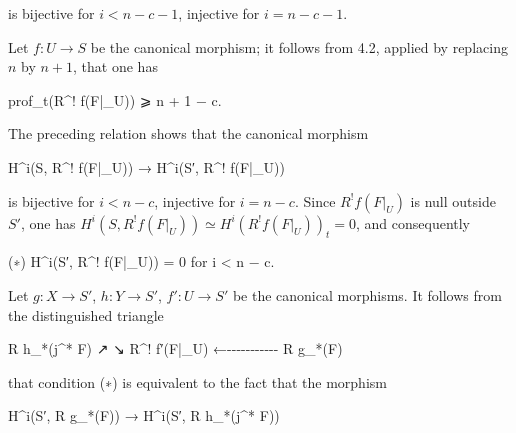 \documentclass[
  11pt,
  a4paper,
]{book}
\newenvironment{Shaded}{}{}
\newcommand{\NormalTok}[1]{#1}
\begin{document}
is bijective for \(i < n - c - 1\), injective for \(i = n - c - 1\).

Let \(f : U \to S\) be the canonical morphism; it follows from 4.2,
applied by replacing \(n\) by \(n + 1\), that one has

\begin{Shaded}
\begin{Highlighting}[]
\NormalTok{prof\_t(R\^{}! f(F|\_U)) ⩾ n + 1 − c.}
\end{Highlighting}
\end{Shaded}

The preceding relation shows that the canonical morphism

\begin{Shaded}
\begin{Highlighting}[]
\NormalTok{H\^{}i(S, R\^{}! f(F|\_U)) → H\^{}i(S′, R\^{}! f(F|\_U))}
\end{Highlighting}
\end{Shaded}

is bijective for \(i < n - c\), injective for \(i = n - c\). Since
\(R^{!} f(F|_{U})\) is null outside \(S'\), one has \(H^{i}(S,
R^{!} f(F|_{U})) \simeq H^{i}(R^{!} f(F|_{U}))_{t} = 0\), and
consequently

\begin{Shaded}
\begin{Highlighting}[]
\NormalTok{(∗) H\^{}i(S′, R\^{}! f(F|\_U)) = 0 for i \textless{} n − c.}
\end{Highlighting}
\end{Shaded}

Let \(g : X \to S'\), \(h : Y \to S'\), \(f' : U \to S'\) be the
canonical morphisms. It follows from the distinguished triangle

\begin{Shaded}
\begin{Highlighting}[]
\NormalTok{              R h\_*(j\^{}* F)}
\NormalTok{             ↗            ↘}
\NormalTok{   R\^{}! f′(F|\_U) ←{-}{-}{-}{-}{-}{-}{-}{-}{-}{-}{-} R g\_*(F)}
\end{Highlighting}
\end{Shaded}

that condition (∗) is equivalent to the fact that the morphism

\begin{Shaded}
\begin{Highlighting}[]
\NormalTok{H\^{}i(S′, R g\_*(F)) → H\^{}i(S′, R h\_*(j\^{}* F))}
\end{Highlighting}
\end{Shaded}
\end{document}
